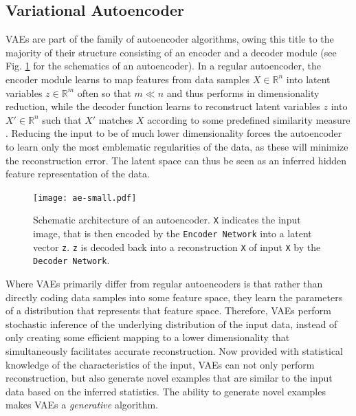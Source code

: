 \documentclass[twocolumn]{article}
\begin{document}

\hypertarget{vae}{%
\subsection{Variational Autoencoder}\label{vae}}

VAEs \citep{kingma2013auto} are part of the family of autoencoder algorithms, owing this title
to the majority of their structure consisting of an encoder and a
decoder module \citep{doersch2016tutorial} (see Fig. \ref{fig:ae} for the
schematics of an autoencoder). In a regular autoencoder, the encoder
module learns to map features from data samples \(X \in \mathbb{R}^{n}\)
into latent variables \(z \in \mathbb{R}^{m}\) often so that \(m \ll n\)
and thus performs in dimensionality reduction, while the decoder
function learns to reconstruct latent variables \(z\) into
\(X' \in \mathbb{R}^{n}\) such that \(X'\) matches \(X\) according to
some predefined similarity measure \citep{liou2014autoencoder}. Reducing
the input to be of much lower dimensionality forces the autoencoder to
learn only the most emblematic regularities of the data, as these will
minimize the reconstruction error. The latent space can thus be seen as
an inferred hidden feature representation of the data.

\begin{figure}
\centering
\texttt{[image: ae-small.pdf]}
\caption{Schematic architecture of an autoencoder. \texttt{X} indicates the input image, that is then encoded by the \texttt{Encoder Network} into a latent vector \texttt{z}. \texttt{z} is decoded back into a reconstruction \texttt{X\textquotesingle} of input \texttt{X} by the \texttt{Decoder Network}.}
\label{fig:ae}
\end{figure}

Where VAEs primarily differ from regular autoencoders is that rather
than directly coding data samples into some feature space, they learn
the parameters of a distribution that represents that feature space.
Therefore, VAEs perform stochastic inference of the underlying
distribution of the input data, instead of only creating some efficient
mapping to a lower dimensionality that simultaneously facilitates
accurate reconstruction. Now provided with statistical knowledge of the
characteristics of the input, VAEs can not only perform reconstruction,
but also generate novel examples that are similar to the input data
based on the inferred statistics. The ability to generate novel examples
makes VAEs a \emph{generative} algorithm.
\end{document}

